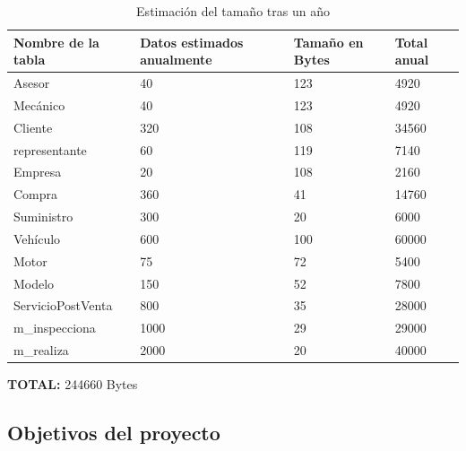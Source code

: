 \documentclass[12pt]{article}
\begin{document}
\begin{table}[h]
    \centering
    \begin{tabular}{|l|l|l|l|}
    \hline
    \textbf{Nombre de la tabla} & \textbf{Datos estimados anualmente} & \textbf{Tamaño en Bytes} & \textbf{Total anual} \\ \hline
    Asesor                      & 40         & 123 & 4920                                   \\ \hline
    Mecánico                    & 40         & 123 & 4920                                   \\ \hline
    Cliente                     & 320        & 108 & 34560                                  \\ \hline
    representante                   & 60         & 119 & 7140                                   \\ \hline
    Empresa                     & 20         & 108 & 2160                                   \\ \hline
    Compra                      & 360        & 41 & 14760                                 \\ \hline
    Suministro                  & 300        & 20 & 6000                                   \\ \hline
    Vehículo                    & 600        & 100 & 60000                                   \\ \hline
    Motor                       & 75         & 72 & 5400                                    \\ \hline
    Modelo                      & 150        & 52 & 7800                                    \\ \hline
    ServicioPostVenta           & 800        & 35  & 28000                                  \\ \hline
    m\_inspecciona              & 1000       & 29  & 29000                                  \\ \hline
    m\_realiza                  & 2000       & 20 & 40000                                   \\ \hline
    \end{tabular}
    \caption{Estimación del tamaño tras un año}
\end{table}

\textbf{TOTAL:} 244660 Bytes

\newpage

\subsection{Objetivos del proyecto}
\end{document}
